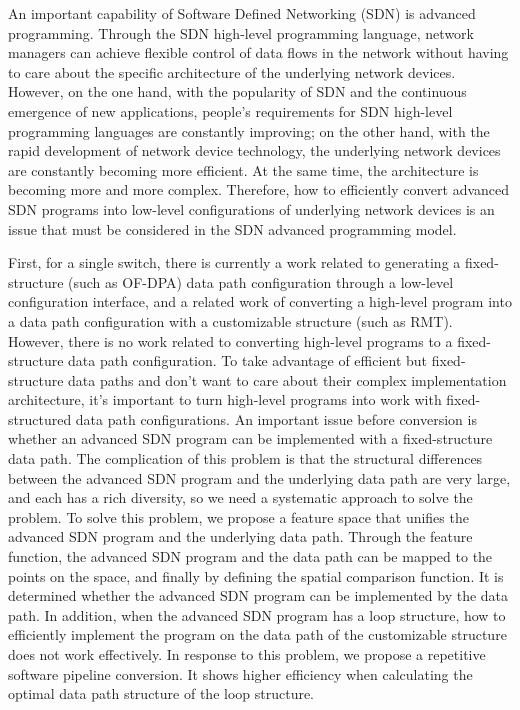 
\begin{eabstract}

An important capability of Software Defined Networking (SDN) is advanced programming. Through the SDN high-level programming language, network managers can achieve flexible control of data flows in the network without having to care about the specific architecture of the underlying network devices. However, on the one hand, with the popularity of SDN and the continuous emergence of new applications, people's requirements for SDN high-level programming languages ​​are constantly improving; on the other hand, with the rapid development of network device technology, the underlying network devices are constantly becoming more efficient. At the same time, the architecture is becoming more and more complex. Therefore, how to efficiently convert advanced SDN programs into low-level configurations of underlying network devices is an issue that must be considered in the SDN advanced programming model.

First, for a single switch, there is currently a work related to generating a fixed-structure (such as OF-DPA) data path configuration through a low-level configuration interface, and a related work of converting a high-level program into a data path configuration with a customizable structure (such as RMT). However, there is no work related to converting high-level programs to a fixed-structure data path configuration. To take advantage of efficient but fixed-structure data paths and don't want to care about their complex implementation architecture, it's important to turn high-level programs into work with fixed-structured data path configurations. An important issue before conversion is whether an advanced SDN program can be implemented with a fixed-structure data path. The complication of this problem is that the structural differences between the advanced SDN program and the underlying data path are very large, and each has a rich diversity, so we need a systematic approach to solve the problem. To solve this problem, we propose a feature space that unifies the advanced SDN program and the underlying data path. Through the feature function, the advanced SDN program and the data path can be mapped to the points on the space, and finally by defining the spatial comparison function. It is determined whether the advanced SDN program can be implemented by the data path. In addition, when the advanced SDN program has a loop structure, how to efficiently implement the program on the data path of the customizable structure does not work effectively. In response to this problem, we propose a repetitive software pipeline conversion. It shows higher efficiency when calculating the optimal data path structure of the loop structure.



\end{eabstract}
